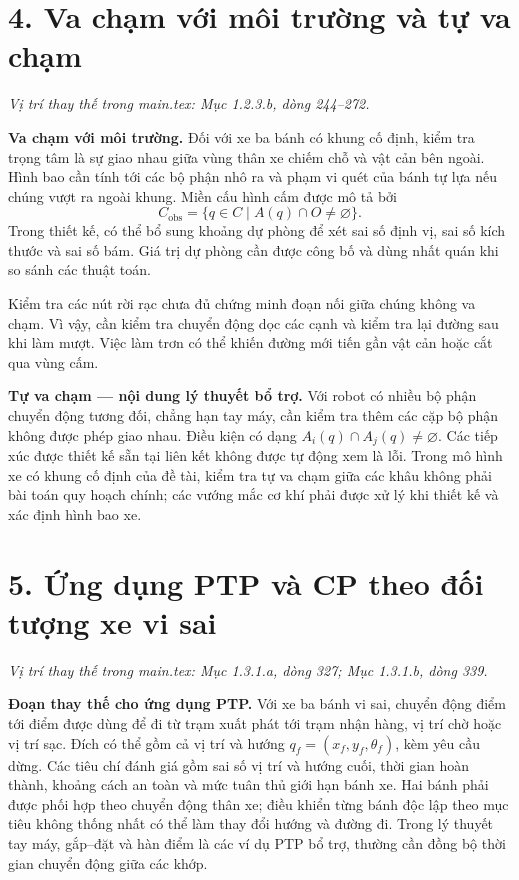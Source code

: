\documentclass[12pt,a4paper,oneside]{report}
\newcommand{\vitri}[1]{\par\noindent\textit{Vị trí thay thế trong main.tex: #1.}\par}
\begin{document}
\section*{4. Va chạm với môi trường và tự va chạm}
\vitri{Mục 1.2.3.b, dòng 244--272}

\noindent\textbf{Va chạm với môi trường.} Đối với xe ba bánh có khung cố định, kiểm tra trọng tâm là sự giao nhau giữa vùng thân xe chiếm chỗ và vật cản bên ngoài. Hình bao cần tính tới các bộ phận nhô ra và phạm vi quét của bánh tự lựa nếu chúng vượt ra ngoài khung. Miền cấu hình cấm được mô tả bởi
\[
  C_{\mathrm{obs}}=\{q\in C\mid A(q)\cap O\neq\varnothing\}.
\]
Trong thiết kế, có thể bổ sung khoảng dự phòng để xét sai số định vị, sai số kích thước và sai số bám. Giá trị dự phòng cần được công bố và dùng nhất quán khi so sánh các thuật toán.

Kiểm tra các nút rời rạc chưa đủ chứng minh đoạn nối giữa chúng không va chạm. Vì vậy, cần kiểm tra chuyển động dọc các cạnh và kiểm tra lại đường sau khi làm mượt. Việc làm trơn có thể khiến đường mới tiến gần vật cản hoặc cắt qua vùng cấm.

\noindent\textbf{Tự va chạm --- nội dung lý thuyết bổ trợ.} Với robot có nhiều bộ phận chuyển động tương đối, chẳng hạn tay máy, cần kiểm tra thêm các cặp bộ phận không được phép giao nhau. Điều kiện có dạng \(A_i(q)\cap A_j(q)\neq\varnothing\). Các tiếp xúc được thiết kế sẵn tại liên kết không được tự động xem là lỗi. Trong mô hình xe có khung cố định của đề tài, kiểm tra tự va chạm giữa các khâu không phải bài toán quy hoạch chính; các vướng mắc cơ khí phải được xử lý khi thiết kế và xác định hình bao xe.

\section*{5. Ứng dụng PTP và CP theo đối tượng xe vi sai}
\vitri{Mục 1.3.1.a, dòng 327; Mục 1.3.1.b, dòng 339}

\noindent\textbf{Đoạn thay thế cho ứng dụng PTP.} Với xe ba bánh vi sai, chuyển động điểm tới điểm được dùng để đi từ trạm xuất phát tới trạm nhận hàng, vị trí chờ hoặc vị trí sạc. Đích có thể gồm cả vị trí và hướng \(q_f=(x_f,y_f,\theta_f)\), kèm yêu cầu dừng. Các tiêu chí đánh giá gồm sai số vị trí và hướng cuối, thời gian hoàn thành, khoảng cách an toàn và mức tuân thủ giới hạn bánh xe. Hai bánh phải được phối hợp theo chuyển động thân xe; điều khiển từng bánh độc lập theo mục tiêu không thống nhất có thể làm thay đổi hướng và đường đi. Trong lý thuyết tay máy, gắp--đặt và hàn điểm là các ví dụ PTP bổ trợ, thường cần đồng bộ thời gian chuyển động giữa các khớp.
\end{document}
